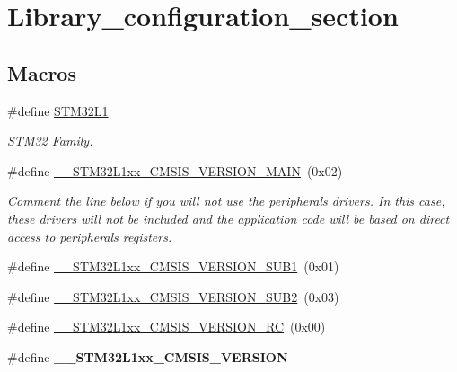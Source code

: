 \hypertarget{group___library__configuration__section}{\section{Library\-\_\-configuration\-\_\-section}
\label{group___library__configuration__section}
}
\subsection*{Macros}
\begin{DoxyCompactItemize}
\item 
\hypertarget{group___library__configuration__section_ga779d6f7402917ba39d057bf865d4279a}{\#define \hyperlink{group___library__configuration__section_ga779d6f7402917ba39d057bf865d4279a}{S\-T\-M32\-L1}}\label{group___library__configuration__section_ga779d6f7402917ba39d057bf865d4279a}

\begin{DoxyCompactList}\small\item\em S\-T\-M32 Family. \end{DoxyCompactList}\item 
\#define \hyperlink{group___library__configuration__section_ga7b0deaa970bfbbe1145abd1cba8a5957}{\-\_\-\-\_\-\-S\-T\-M32\-L1xx\-\_\-\-C\-M\-S\-I\-S\-\_\-\-V\-E\-R\-S\-I\-O\-N\-\_\-\-M\-A\-I\-N}~(0x02)
\begin{DoxyCompactList}\small\item\em Comment the line below if you will not use the peripherals drivers. In this case, these drivers will not be included and the application code will be based on direct access to peripherals registers. \end{DoxyCompactList}\item 
\#define \hyperlink{group___library__configuration__section_ga6f7924aaddc0243d031cbe8d34db786a}{\-\_\-\-\_\-\-S\-T\-M32\-L1xx\-\_\-\-C\-M\-S\-I\-S\-\_\-\-V\-E\-R\-S\-I\-O\-N\-\_\-\-S\-U\-B1}~(0x01)
\item 
\#define \hyperlink{group___library__configuration__section_ga1dfac30132feed1a41875d404d77881a}{\-\_\-\-\_\-\-S\-T\-M32\-L1xx\-\_\-\-C\-M\-S\-I\-S\-\_\-\-V\-E\-R\-S\-I\-O\-N\-\_\-\-S\-U\-B2}~(0x03)
\item 
\#define \hyperlink{group___library__configuration__section_gaa41501c0f38513be75dc3c0af686438b}{\-\_\-\-\_\-\-S\-T\-M32\-L1xx\-\_\-\-C\-M\-S\-I\-S\-\_\-\-V\-E\-R\-S\-I\-O\-N\-\_\-\-R\-C}~(0x00)
\item 
\#define {\bfseries \-\_\-\-\_\-\-S\-T\-M32\-L1xx\-\_\-\-C\-M\-S\-I\-S\-\_\-\-V\-E\-R\-S\-I\-O\-N}
\end{DoxyCompactItemize}


